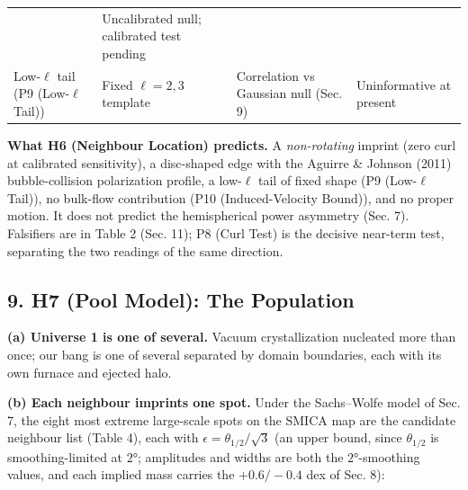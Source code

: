 \documentclass[
]{article}
\begin{document}
\begin{longtable}[]{@{}llll@{}}
\begin{minipage}[t]{0.22\columnwidth}
\end{minipage} & \begin{minipage}[t]{0.22\columnwidth}\raggedright
Uncalibrated null; calibrated test pending\strut
\end{minipage}\tabularnewline
\begin{minipage}[t]{0.22\columnwidth}\raggedright
Low-\(\ell\) tail (P9 (Low-\(\ell\) Tail))\strut
\end{minipage} & \begin{minipage}[t]{0.22\columnwidth}\raggedright
Fixed \(\ell=2,3\) template\strut
\end{minipage} & \begin{minipage}[t]{0.22\columnwidth}\raggedright
Correlation vs Gaussian null (Sec. 9)\strut
\end{minipage} & \begin{minipage}[t]{0.22\columnwidth}\raggedright
Uninformative at present\strut
\end{minipage}\tabularnewline
\bottomrule
\end{longtable}

\textbf{What H6 (Neighbour Location) predicts.} A \emph{non-rotating}
imprint (zero curl at calibrated sensitivity), a disc-shaped edge with
the Aguirre \& Johnson (2011) bubble-collision polarization profile, a
low-\(\ell\) tail of fixed shape (P9 (Low-\(\ell\) Tail)), no bulk-flow
contribution (P10 (Induced-Velocity Bound)), and no proper motion. It
does not predict the hemispherical power asymmetry (Sec. 7). Falsifiers
are in Table 2 (Sec. 11); P8 (Curl Test) is the decisive near-term test,
separating the two readings of the same direction.

\hypertarget{h7-pool-model-the-population}{%
\subsection{\texorpdfstring{\textbf{9. H7 (Pool Model): The
Population}}{9. H7 (Pool Model): The Population}}\label{h7-pool-model-the-population}}

\textbf{(a) Universe 1 is one of several.} Vacuum crystallization
nucleated more than once; our bang is one of several separated by domain
boundaries, each with its own furnace and ejected halo.

\textbf{(b) Each neighbour imprints one spot.} Under the Sachs--Wolfe
model of Sec. 7, the eight most extreme large-scale spots on the SMICA
map are the candidate neighbour list (Table 4), each with
\(\epsilon = \theta_{1/2}/\sqrt{3}\) (an upper bound, since
\(\theta_{1/2}\) is smoothing-limited at \(2°\); amplitudes and widths
are both the \(2°\)-smoothing values, and each implied mass carries the
\(+0.6/-0.4\) dex of Sec. 8):
\end{document}
